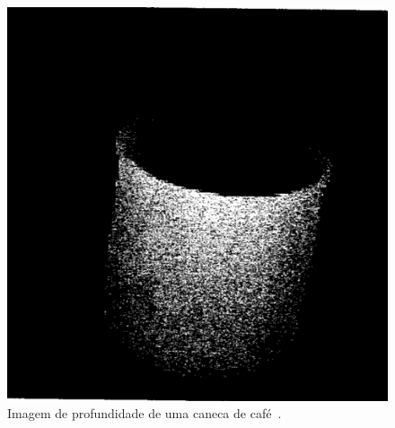 	\begin{figure}[htb]
		\begin{center}
			\includegraphics[scale=0.3]{figuras/2.FundamentacaoTeorica/depthimage.png}
		\end{center}
		\caption{Imagem de profundidade de uma caneca de café~\cite{jain}.}
		\label{depthimage}
	\end{figure}

